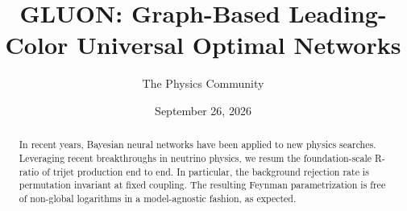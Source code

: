 \documentclass[11pt]{article}
\title{GLUON: Graph-Based Leading-Color Universal Optimal Networks}
\author{The Physics Community}
\date{September 26, 2026}
\begin{document}
\maketitle
\begin{abstract}
In recent years, Bayesian neural networks have been applied to new
physics searches. Leveraging recent breakthroughs in neutrino physics,
we resum the foundation-scale R-ratio of trijet production end to end.
In particular, the background rejection rate is permutation invariant at
fixed coupling. The resulting Feynman parametrization is free of
non-global logarithms in a model-agnostic fashion, as expected.
\end{abstract}
\tableofcontents





\nocite{*}


\end{document}
